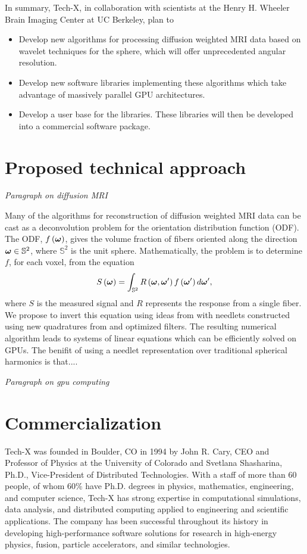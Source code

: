 \documentclass[10pt]{article}
\begin{document}
In summary, Tech-X, in collaboration with scientists at the Henry H. Wheeler Brain Imaging Center at UC Berkeley, plan to 
\begin{itemize}
  \item{Develop new algorithms for processing diffusion weighted MRI data based on wavelet techniques for the sphere, which will offer unprecedented angular resolution.}
  \item{Develop new software libraries implementing these algorithms which take advantage of massively parallel GPU architectures.}
  \item{Develop a user base for the libraries. These libraries will then be developed into a commercial software package.}
\end{itemize}

\section*{Proposed technical approach}
\emph{Paragraph on diffusion MRI}

Many of the algorithms for reconstruction of diffusion weighted MRI data can be cast as a deconvolution problem for the orientation distribution function (ODF)\cite{JIA-VEM-2007}. The ODF, $f\left({\boldsymbol{\omega}}\right)$, gives the volume fraction of fibers oriented along the direction ${\boldsymbol{\omega}}\in\mathbb{S}^2$, where $\mathbb{S}^2$ is the unit sphere. Mathematically, the problem is to determine $f$, for each voxel, from the equation
\begin{equation*}
  S\left({\boldsymbol{\omega}}\right) = \int_{\mathbb{S}^2} R\left({\boldsymbol{\omega}},{\boldsymbol{\omega}}'\right) f\left({\boldsymbol{\omega}}'\right)d{\boldsymbol{\omega}}',
\end{equation*}  
where $S$ is the measured signal and $R$ represents the response from a single fiber. We propose to invert this equation using ideas from \cite{KE-NG-PI-2009} with needlets constructed using new quadratures from \cite{AHR-BEY-2009} and optimized filters. The resulting numerical algorithm leads to systems of linear equations which can be efficiently solved on GPUs. The benifit of using a needlet representation over traditional spherical harmonics is that....

\emph{Paragraph on gpu computing}

\section*{Commercialization}
Tech-X was founded in Boulder, CO in 1994 by John R. Cary, CEO and Professor of Physics at the University of Colorado and Svetlana Shasharina, Ph.D., Vice-President of Distributed Technologies. With a staff of more than 60 people, of whom 60\% have Ph.D. degrees in physics, mathematics, engineering, and computer science, Tech-X has strong expertise in computational simulations, data analysis, and distributed computing applied to engineering and scientific applications.  The company has been successful throughout its history in developing high-performance software solutions for research in high-energy physics, fusion, particle accelerators, and similar technologies.
\end{document}

